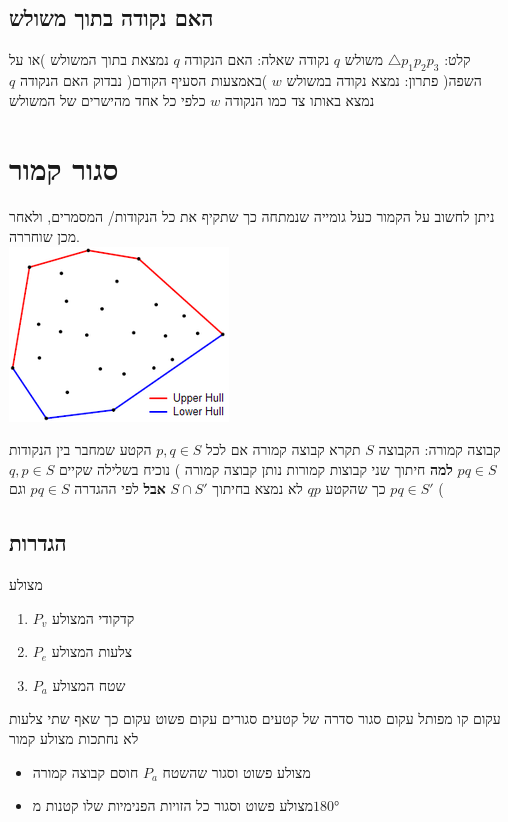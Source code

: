 \documentclass{article}
\makeatletter
\newcommand*{\saved@uline}{}
\let\saved@uline\uline
\newcommand*{\mathuline}{%
  \mathpalette{\math@uline\saved@uline}%
}
\newcommand*{\math@uline}[3]{%
  \mbox{#1{$#2#3\m@th$}}%
}
\renewcommand*{\uline}{%
  \relax  
  \ifmmode
    \expandafter\mathuline
  \else
    \expandafter\saved@uline
  \fi
}
\makeatother
\begin{document}
\subsection{האם נקודה בתוך משולש}
\noindent \uline{קלט:} $\triangle p_1p_2p_3$ משולש $q$ נקודה
\newline \uline{שאלה:} האם הנקודה $q$ נמצאת בתוך המשולש )או על השפה(
\newline \uline{פתרון:} נמצא נקודה במשולש $w$ )באמצעות הסעיף הקודם( נבדוק האם הנקודה $q$ נמצא באותו צד כמו הנקודה $w$ כלפי כל אחד מהישרים של המשולש 

\section{ סגור קמור}
ניתן לחשוב על הקמור כעל גומייה שנמתחה כך שתקיף את כל הנקודות/ המסמרים, ולאחר מכן שוחררה.\\
\includegraphics[scale=0.7]{z1.png}

\uline{קבוצה קמורה:} הקבוצה $S$ תקרא קבוצה קמורה אם לכל $p,q\in S$ הקטע שמחבר בין הנקודות $pq\in S$
\newline\newline\textbf{למה} חיתוך שני קבוצות קמורות נותן קבוצה קמורה
) נוכיח בשלילה שקיים $q,p\in S$ כך שהקטע $qp$ לא נמצא בחיתוך $S\cap S'$ \textbf{אבל} לפי ההגדרה $pq \in S$ וגם $pq \in S'$ (

\subsection{הגדרות}
\uline{מצולע}
\begin{enumerate}
\item $P_v$ קדקודי המצולע
\item $P_e$ צלעות המצולע
\item $P_a$ שטח המצולע
\end{enumerate}
\uline{עקום} קו מפותל
\newline\uline{עקום סגור} סדרה של קטעים סגורים
\newline\uline{עקום פשוט} עקום כך שאף שתי צלעות לא נחתכות
\uline{מצולע קמור}
\begin{itemize}
\item מצולע פשוט וסגור שהשטח $P_a$ חוסם קבוצה קמורה
\item מצולע פשוט וסגור כל הזויות הפנימיות שלו קטנות מ$\ang{180}$
\end{itemize}
\end{document}

